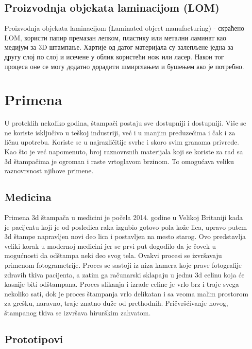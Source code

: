 \documentclass[a4paper]{article}
\begin{document}
{\subsection{Proizvodnja objekata laminacijom (LOM)}
\label{subsec:podnaslov5}
Proizvodnja objekata laminacijom (Laminated object manufacturing) - скраћено LOM, користи папир премазан лепком, пластику или метални ламинат као медијум за 3D штампање. 
\bigbreak Хартије од датог материјала су залепљене једна за другу слој по слој и исечене у облик користећи нож или ласер. Након тог процеса оне се могу додатно дорадити шмирглањем и бушењем ако је потребно.

\newpage

\section{Primena}
\label{sec:Primena}

U proteklih nekoliko godina, štampači postaju sve dostupniji i dostupniji. Više se ne koriste isključivo u teškoj industriji, već i u manjim preduzećima i čak i za ličnu upotrebu. Koriste se u najrazličitije svrhe i skoro svim granama privrede. Kao što je već napomenuto, broj raznovrsnih materijala koji se koriste za rad sa 3d štampačima je ogroman i raste vrtoglavom brzinom. To omogućava veliku raznovrsnost njihove primene. 

\subsection{Medicina}
\label{subsec:podnaslov6}

Primena 3d štampača u medicini je počela 2014. godine u Velikoj Britaniji kada je pacijentu koji je od posledica raka izgubio gotovo pola kože lica, upravo putem 3d štampe napravljen novi deo lica i postavljen na mesto starog. Ovo predstavlja veliki korak u modernoj medicini jer se prvi put dogodilo da je čovek u mogućnosti da odštampa neki deo svog tela. 
\bigbreak Ovakvi procesi se izvršavaju primenom fotogrametrije. Proces se sastoji iz niza kamera koje prave fotografije zdravih tkiva pacijenta, a zatim ga računarski sklapaju u jednu 3d celinu koja će kasnije biti odštampana. Proces slikanja i izrade celine je vrlo brz i traje svega nekoliko sati, dok je proces štampanja vrlo delikatan i sa veoma malim prostorom za grešku, naravno, traje znatno duže od prethodnih. Pričvršćivanje novog, štampanog tkiva se izvršava hirurškim zahvatom.

\subsection{Prototipovi}
\label{subsec:podnaslov7}

}
\end{document}
